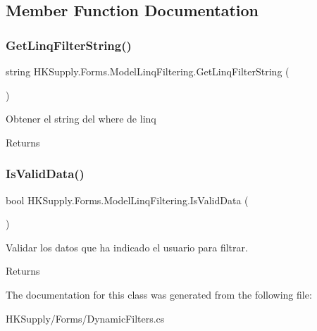 \subsection{Member Function Documentation}
\mbox{\label{class_h_k_supply_1_1_forms_1_1_model_linq_filtering_acae6326ecf09c74070e6d5155c7eb067}} 
\subsubsection{\texorpdfstring{Get\+Linq\+Filter\+String()}{GetLinqFilterString()}}
{\footnotesize\ttfamily string H\+K\+Supply.\+Forms.\+Model\+Linq\+Filtering.\+Get\+Linq\+Filter\+String (\begin{DoxyParamCaption}{ }\end{DoxyParamCaption})}



Obtener el string del where de linq 

\begin{DoxyReturn}{Returns}

\end{DoxyReturn}
\mbox{\label{class_h_k_supply_1_1_forms_1_1_model_linq_filtering_a66694e21272523c30da7198388f59b0f}} 
\subsubsection{\texorpdfstring{Is\+Valid\+Data()}{IsValidData()}}
{\footnotesize\ttfamily bool H\+K\+Supply.\+Forms.\+Model\+Linq\+Filtering.\+Is\+Valid\+Data (\begin{DoxyParamCaption}{ }\end{DoxyParamCaption})}



Validar los datos que ha indicado el usuario para filtrar. 

\begin{DoxyReturn}{Returns}

\end{DoxyReturn}


The documentation for this class was generated from the following file\+:\begin{DoxyCompactItemize}
\item 
H\+K\+Supply/\+Forms/Dynamic\+Filters.\+cs\end{DoxyCompactItemize}
